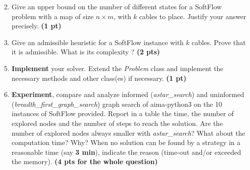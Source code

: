 \documentclass[11pt,a4paper]{report}
\begin{document}
\begin{answers}[8cm]
\end{answers}


\newpage
\begin{enumerate}
\setcounter{enumi}{1}
\item Give an upper bound on the number of different states for a SoftFlow problem with a map of size $n \times m$, with $k$ cables to place. Justify your answer precisely.  \textbf{(1 pt)}
\end{enumerate}

\begin{answers}[5cm]
\end{answers}



\begin{enumerate}
\setcounter{enumi}{2}
\item Give an admissible heuristic for a SoftFlow instance with $k$ cables. Prove that it is admissible. What is its complexity ?  \textbf{(2 pts)}
\end{enumerate}

\begin{answers}[5cm]
\end{answers}



\begin{enumerate}
\setcounter{enumi}{4}
\item \textbf{Implement} your solver. Extend the \emph{Problem} class and implement 
		the necessary methods and other class(es) if necessary.  \textbf{(1 pt)}
\item \textbf{Experiment}, compare and analyze informed 
		(\emph{astar\_search}) and uninformed\\
		(\emph{breadth\_first\_graph\_search}) graph search of aima-python3 on the 
		10 instances of SoftFlow provided.
		Report in a table the time, the number of explored nodes and the number of 
		steps to reach the solution. 
		Are the number of explored nodes always smaller with 
		\emph{astar\_search}? 
		What about the computation time? 
		Why? 
		 When no solution can be found by a strategy in a reasonable time (say \textbf{3 
		 min}), indicate the reason (time-out and/or exceeded the memory). \textbf{(4 pts for the whole question)}
\end{enumerate}

\begin{answers}[8cm]

\end{answers}
\end{document}
